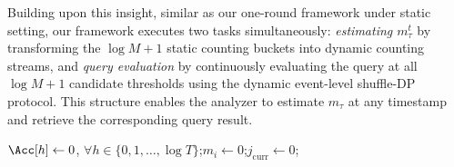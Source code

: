 Building upon this insight, similar as our one-round framework under static setting, our framework executes two tasks simultaneously: 
\textit{estimating $m_\tau^t$} by transforming the $\log M + 1$ static counting buckets into dynamic counting streams, and \textit{query evaluation} by continuously evaluating the query at all $\log M + 1$ candidate thresholds using the dynamic event-level shuffle-DP protocol.
This structure enables the analyzer to estimate $m_\tau$ at any timestamp and retrieve the corresponding query result.







\begin{algorithm}[t]
\caption{Dynamic Counting (User Side)}
\label{alg:dynamic_counting}

$\Acc[h] \leftarrow 0$, $\forall h \in \{0, 1, \dots, \log T\}$;\enspace $m_i \leftarrow 0$;\enspace $j_{\text{curr}} \leftarrow 0$;

\end{algorithm}



